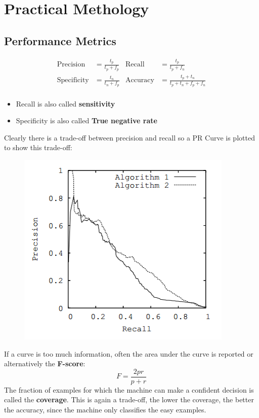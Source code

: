 \section{Practical Methology}
\begin{multicols}{2}
	\subsection{Performance Metrics}
	\begin{align*}
	\text{Precision} &= \frac{t_p}{t_p+f_p} & \text{Recall} &= \frac{t_p}{t_p+f_n}\\
	\text{Specificity} &= \frac{t_n}{t_n+f_p} & \text{Accuracy} &= \frac{t_p+t_n}{t_p+t_n+f_p+f_n}\\
	\end{align*}
	\begin{itemize}
		\item Recall is also called \textbf{sensitivity}
		\item Specificity is also called \textbf{True negative rate}
	\end{itemize}
	Clearly there is a trade-off between precision and recall so a PR Curve is plotted to show this trade-off:
	\begin{figure}[H]
		\centering
		\includegraphics[width=0.75\linewidth]{images/pr_curve.png}
	\end{figure}
	If a curve is too much information, often the area under the curve is reported or alternatively the \textbf{F-score}:
	\[ F = \frac{2pr}{p+r} \]
	The fraction of examples for which the machine can make a confident decision is called the \textbf{coverage}.
	This is again a trade-off, the lower the coverage, the better the accuracy, since the machine only classifies the easy examples.\\
	

\end{multicols}
